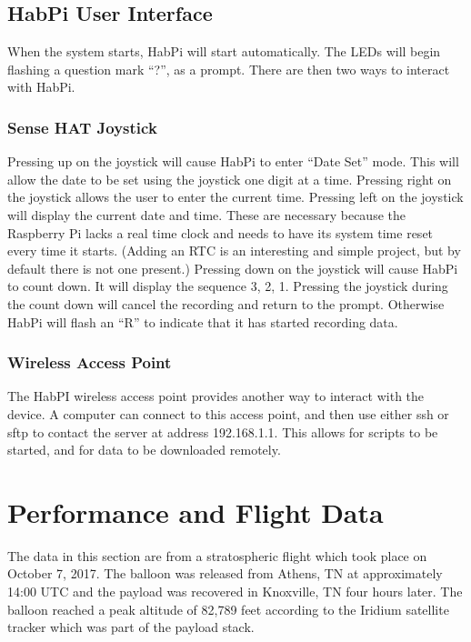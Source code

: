 \documentclass[journal]{new-aiaa}
\begin{document}
\subsection{HabPi User Interface}
When the system starts, HabPi will start automatically.  The LEDs
will begin flashing a question mark ``?'', as a prompt.  There are
then two ways to interact with HabPi. 

\subsubsection{Sense HAT Joystick}
Pressing up on the joystick will cause HabPi to enter ``Date Set''
mode.  This will allow the date to be set using the joystick one digit
at a time.  Pressing right on the joystick allows the user to enter
the current time.  Pressing left on the joystick will display the
current date and time.  These are necessary because the Raspberry Pi
lacks a real time clock and needs to have its system time reset every
time it starts.  (Adding an RTC is an interesting and simple project, but by default
there is not one present.)  
Pressing down on the joystick will cause HabPi to count down.
It will display the sequence 3, 2, 1.  Pressing the joystick during
the count down will cancel the recording and return to the prompt.
Otherwise HabPi will flash an ``R'' to indicate that it has started
recording data.

\subsubsection{Wireless Access Point}
The HabPI wireless access point provides another way to interact with
the device.  A computer can connect to this access point, and then use
either ssh or sftp to contact the server at address 192.168.1.1.  This
allows for scripts to be started, and for data to be downloaded
remotely.

\section{Performance and Flight Data}
The data in this section are from a stratospheric flight which took
place on October 7, 2017.  The balloon was released from Athens, TN 
at approximately 14:00 UTC and the payload was recovered in 
Knoxville, TN four hours later.  The balloon reached a peak altitude
of 82,789 feet according to the Iridium satellite tracker which was
part of the payload stack.
\end{document}
